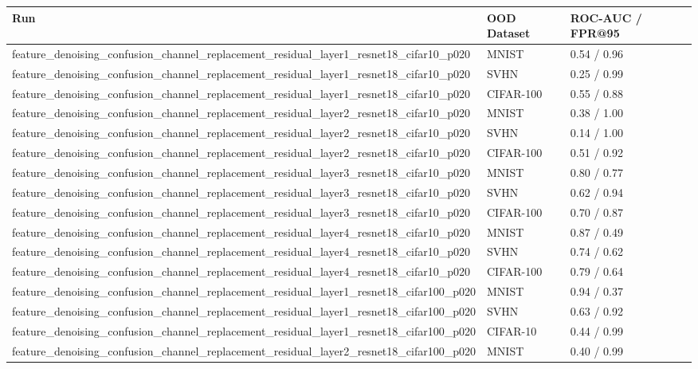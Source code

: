 \begin{tabular}{lll}
\toprule
Run & OOD Dataset & ROC-AUC / FPR@95 \\
\midrule
feature\_denoising\_confusion\_channel\_replacement\_residual\_layer1\_resnet18\_cifar10\_p020 & MNIST & 0.54 / 0.96 \\
feature\_denoising\_confusion\_channel\_replacement\_residual\_layer1\_resnet18\_cifar10\_p020 & SVHN & 0.25 / 0.99 \\
feature\_denoising\_confusion\_channel\_replacement\_residual\_layer1\_resnet18\_cifar10\_p020 & CIFAR-100 & 0.55 / 0.88 \\
feature\_denoising\_confusion\_channel\_replacement\_residual\_layer2\_resnet18\_cifar10\_p020 & MNIST & 0.38 / 1.00 \\
feature\_denoising\_confusion\_channel\_replacement\_residual\_layer2\_resnet18\_cifar10\_p020 & SVHN & 0.14 / 1.00 \\
feature\_denoising\_confusion\_channel\_replacement\_residual\_layer2\_resnet18\_cifar10\_p020 & CIFAR-100 & 0.51 / 0.92 \\
feature\_denoising\_confusion\_channel\_replacement\_residual\_layer3\_resnet18\_cifar10\_p020 & MNIST & 0.80 / 0.77 \\
feature\_denoising\_confusion\_channel\_replacement\_residual\_layer3\_resnet18\_cifar10\_p020 & SVHN & 0.62 / 0.94 \\
feature\_denoising\_confusion\_channel\_replacement\_residual\_layer3\_resnet18\_cifar10\_p020 & CIFAR-100 & 0.70 / 0.87 \\
feature\_denoising\_confusion\_channel\_replacement\_residual\_layer4\_resnet18\_cifar10\_p020 & MNIST & 0.87 / 0.49 \\
feature\_denoising\_confusion\_channel\_replacement\_residual\_layer4\_resnet18\_cifar10\_p020 & SVHN & 0.74 / 0.62 \\
feature\_denoising\_confusion\_channel\_replacement\_residual\_layer4\_resnet18\_cifar10\_p020 & CIFAR-100 & 0.79 / 0.64 \\
feature\_denoising\_confusion\_channel\_replacement\_residual\_layer1\_resnet18\_cifar100\_p020 & MNIST & 0.94 / 0.37 \\
feature\_denoising\_confusion\_channel\_replacement\_residual\_layer1\_resnet18\_cifar100\_p020 & SVHN & 0.63 / 0.92 \\
feature\_denoising\_confusion\_channel\_replacement\_residual\_layer1\_resnet18\_cifar100\_p020 & CIFAR-10 & 0.44 / 0.99 \\
feature\_denoising\_confusion\_channel\_replacement\_residual\_layer2\_resnet18\_cifar100\_p020 & MNIST & 0.40 / 0.99 \\

\end{tabular}
